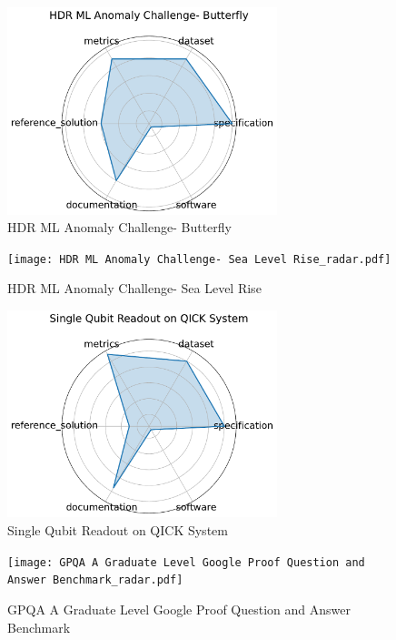 \documentclass{article}
\begin{document}
\begin{figure}[h!]
  \centering
  \includegraphics[width=0.7\textwidth]{HDR ML Anomaly Challenge- Butterfly_radar.pdf}
  \caption{HDR ML Anomaly Challenge- Butterfly \cite{campolongo2025buildingmachinelearningchallenges2}}
\end{figure}

\begin{figure}[h!]
  \centering
  \texttt{[image: HDR ML Anomaly Challenge- Sea Level Rise\_radar.pdf]}
  \caption{HDR ML Anomaly Challenge- Sea Level Rise \cite{campolongo2025buildingmachinelearningchallenges3}}
\end{figure}

\begin{figure}[h!]
  \centering
  \includegraphics[width=0.7\textwidth]{Single Qubit Readout on QICK System_radar.pdf}
  \caption{Single Qubit Readout on QICK System \cite{diguglielmo2025endtoendworkflowmachinelearningbased}}
\end{figure}

\begin{figure}[h!]
  \centering
  \texttt{[image: GPQA A Graduate Level Google Proof Question and Answer Benchmark\_radar.pdf]}
  \caption{GPQA A Graduate Level Google Proof Question and Answer Benchmark \cite{rein2023gpqagraduatelevelgoogleproofqa}}
\end{figure}
\end{document}
